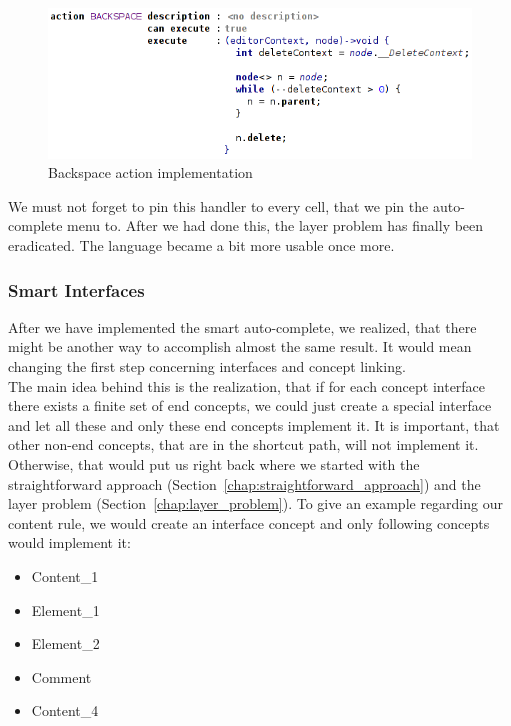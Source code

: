 \begin{figure}[h]
	\centering
	\includegraphics[width=\textwidth]{./img/backspace_action.png}
	\caption{Backspace action implementation}
	\label{fig:backspace_action}
\end{figure}

We must not forget to pin this handler to every cell, that we pin the auto-complete menu to.
After we had done this, the layer problem has finally been eradicated.
The language became a bit more usable once more.

\subsubsection{Smart Interfaces}

After we have implemented the smart auto-complete, we realized, that there might be another way to accomplish almost the same result.
It would mean changing the first step concerning interfaces and concept linking.
\\

The main idea behind this is the realization, that if for each concept interface there exists a finite set of end concepts, we could just create a special interface and let all these and only these end concepts implement it.
It is important, that other non-end concepts, that are in the shortcut path, will not implement it.
Otherwise, that would put us right back where we started with the straightforward approach (Section~\ref{chap:straightforward_approach}) and the layer problem (Section~\ref{chap:layer_problem}).
To give an example regarding our content rule, we would create an  interface concept and only following concepts would implement it:

\begin{itemize}
	\itemsep0em
	\item Content{\_}1
	\item Element{\_}1
	\item Element{\_}2
	\item Comment
	\item Content{\_}4
\end{itemize}

